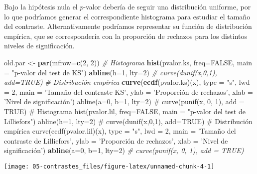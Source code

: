 \documentclass[]{book}
\newenvironment{Shaded}{\begin{snugshade}}{\end{snugshade}}
\newcommand{\KeywordTok}[1]{\textcolor[rgb]{0.13,0.29,0.53}{\textbf{#1}}}
\newcommand{\DataTypeTok}[1]{\textcolor[rgb]{0.13,0.29,0.53}{#1}}
\newcommand{\DecValTok}[1]{\textcolor[rgb]{0.00,0.00,0.81}{#1}}
\newcommand{\StringTok}[1]{\textcolor[rgb]{0.31,0.60,0.02}{#1}}
\newcommand{\CommentTok}[1]{\textcolor[rgb]{0.56,0.35,0.01}{\textit{#1}}}
\newcommand{\OtherTok}[1]{\textcolor[rgb]{0.56,0.35,0.01}{#1}}
\newcommand{\NormalTok}[1]{#1}
\theoremstyle{break}
\theoremstyle{definition}
\theoremstyle{definition}
\theoremstyle{definition}
\theoremstyle{remark}
\begin{document}
Bajo la hipótesis nula el \(p\)-valor debería de seguir una distribución
uniforme, por lo que podríamos generar el correspondiente histograma
para estudiar el tamaño del contraste. Alternativamente podríamos
representar su función de distribución empírica, que se correspondería
con la proporción de rechazos para los distintos niveles de
significación.

\begin{Shaded}
\begin{Highlighting}[]
\NormalTok{old.par <-}\StringTok{ }\KeywordTok{par}\NormalTok{(}\DataTypeTok{mfrow=}\KeywordTok{c}\NormalTok{(}\DecValTok{2}\NormalTok{, }\DecValTok{2}\NormalTok{))}
\CommentTok{# Histograma}
\KeywordTok{hist}\NormalTok{(pvalor.ks, }\DataTypeTok{freq=}\OtherTok{FALSE}\NormalTok{, }\DataTypeTok{main =} \StringTok{"p-valor del test de KS"}\NormalTok{)}
\KeywordTok{abline}\NormalTok{(}\DataTypeTok{h=}\DecValTok{1}\NormalTok{, }\DataTypeTok{lty=}\DecValTok{2}\NormalTok{)   }\CommentTok{# curve(dunif(x,0,1), add=TRUE)}
\CommentTok{# Distribución empírica}
\KeywordTok{curve}\NormalTok{(}\KeywordTok{ecdf}\NormalTok{(pvalor.ks)(x), }\DataTypeTok{type =} \StringTok{"s"}\NormalTok{, }\DataTypeTok{lwd =} \DecValTok{2}\NormalTok{, }
      \DataTypeTok{main =} \StringTok{'Tamaño del contraste KS'}\NormalTok{, }\DataTypeTok{ylab =} \StringTok{'Proporción de rechazos'}\NormalTok{, }
      \DataTypeTok{xlab =} \StringTok{'Nivel de significación')}
\StringTok{abline(a=0, b=1, lty=2)   # curve(punif(x, 0, 1), add = TRUE)}
\StringTok{# Histograma}
\StringTok{hist(pvalor.lil, freq=FALSE, main = "p-valor del test de Lilliefors")}
\StringTok{abline(h=1, lty=2)   # curve(dunif(x,0,1), add=TRUE)}
\StringTok{# Distribución empírica}
\StringTok{curve(ecdf(pvalor.lil)(x), type = "s", lwd = 2, }
\StringTok{      main = '}\NormalTok{Tamaño del contraste de Lilliefors}\StringTok{', ylab = '}\NormalTok{Proporción de rechazos}\StringTok{', }
\StringTok{      xlab = '}\NormalTok{Nivel de significación')}
\KeywordTok{abline}\NormalTok{(}\DataTypeTok{a=}\DecValTok{0}\NormalTok{, }\DataTypeTok{b=}\DecValTok{1}\NormalTok{, }\DataTypeTok{lty=}\DecValTok{2}\NormalTok{)   }\CommentTok{# curve(punif(x, 0, 1), add = TRUE)}
\end{Highlighting}
\end{Shaded}

\begin{center}\texttt{[image: 05-contrastes\_files/figure-latex/unnamed-chunk-4-1]} \end{center}
\end{document}
